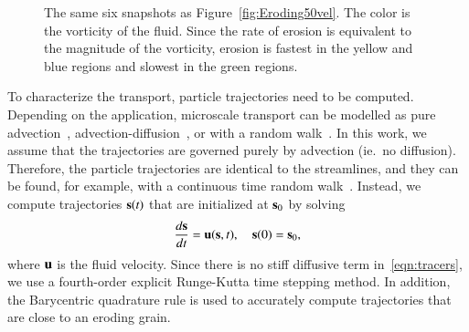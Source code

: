 \documentclass[preprint,10pt]{elsarticle}
\begin{document}
\begin{figure}[H]
\begin{center}
\caption{\label{fig:Eroding50vort} The same six snapshots as
Figure~\ref{fig:Eroding50vel}.  The color is the vorticity of the fluid.
Since the rate of erosion is equivalent to the magnitude of the
vorticity, erosion is fastest in the yellow and blue regions and slowest
in the green regions.}
\end{center}
\end{figure}

To characterize the transport, particle trajectories need to be
computed. Depending on the application, microscale transport can be
modelled as pure advection~\cite{dea-qua-bir-jua2018,
leb-ded-dav-bou2007, cve-che-wen1996, puy-gou-den2019},
advection-diffusion~\cite{cus-hu-den1995, dag1987, den-ica-hid2018}, or
with a random walk~\cite{saf1959, bij-blu2006, ber-sch-sil2000}.  In
this work, we assume that the trajectories are governed purely by
advection (ie.~no diffusion). Therefore, the particle trajectories are
identical to the streamlines, and they can be found, for example, with a
continuous time random walk~\cite{mon-wei1965, den-cor-sch-ber2004,
leb-den-car2008, ber-cor-den-sch2006}.  Instead,  we compute
trajectories $\ss(t)$ that are initialized at $\ss_0$ by solving
\begin{align}
  \frac{d\ss}{dt} = \uu(\ss,t), \quad \ss(0) = \ss_0,
  \label{eqn:tracers}
\end{align}
where $\uu$ is the fluid velocity.  Since there is no stiff diffusive
term in~\eqref{eqn:tracers}, we use a fourth-order explicit Runge-Kutta
time stepping method.  In addition, the Barycentric quadrature rule is used to
accurately compute trajectories that are close to an eroding grain.
\end{document}
